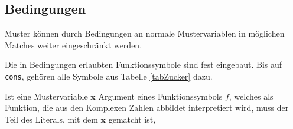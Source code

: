 \subsection{Bedingungen} \label{subsubsecBedingungen}
Muster können durch Bedingungen an normale Mustervariablen in möglichen Matches weiter eingeschränkt werden.

Die in Bedingungen erlaubten Funktionssymbole sind fest eingebaut. Bis auf \verb|cons|, gehören alle Symbole aus Tabelle \ref{tabZucker} dazu. 


Ist eine Mustervariable $\mathbf x$ Argument eines Funktionssymbols $f$, welches als Funktion, die aus den Komplexen Zahlen abbildet interpretiert wird, muss der Teil des Literals, mit dem $\mathbf x$ gematcht ist, 





